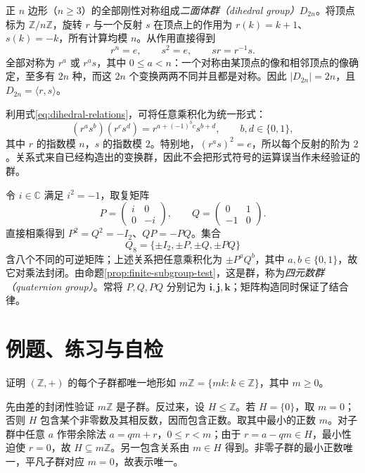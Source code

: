 \begin{example}[二面体群]\label{ex:dihedral-group}
正 $n$ 边形（$n\geq3$）的全部刚性对称组成\emph{二面体群（dihedral group）}$D_{2n}$。将顶点标为 $\mathbb Z/n\mathbb Z$，旋转 $r$ 与一个反射 $s$ 在顶点上的作用为 $r(k)=k+1$、$s(k)=-k$，所有计算均模 $n$。从作用直接得到
\begin{equation}\label{eq:dihedral-relations}
  r^n=e,\qquad s^2=e,\qquad sr=r^{-1}s.
\end{equation}
全部对称为 $r^a$ 或 $r^as$，其中 $0\leq a<n$：一个对称由某顶点的像和相邻顶点的像确定，至多有 $2n$ 种，而这 $2n$ 个变换两两不同并且都是对称。因此 $|D_{2n}|=2n$，且 $D_{2n}=\langle r,s\rangle$。
\end{example}

利用式\eqref{eq:dihedral-relations}，可将任意乘积化为统一形式：
\begin{equation}\label{eq:dihedral-multiplication}
  (r^as^b)(r^cs^d)=r^{a+(-1)^bc}s^{b+d},
  \qquad b,d\in\{0,1\},
\end{equation}
其中 $r$ 的指数模 $n$，$s$ 的指数模 $2$。特别地，$(r^as)^2=e$，所以每个反射的阶为 $2$。关系式来自已经构造出的变换群，因此不会把形式符号的运算误当作未经验证的群。

\begin{example}[四元数群]\label{ex:quaternion-group}
令 $i\in\mathbb C$ 满足 $i^2=-1$，取复矩阵
\[
  P=\begin{pmatrix}i&0\\0&-i\end{pmatrix},\qquad
  Q=\begin{pmatrix}0&1\\-1&0\end{pmatrix}.
\]
直接相乘得到 $P^2=Q^2=-I_2$、$QP=-PQ$。集合
\[
  Q_8=\{\pm I_2,\pm P,\pm Q,\pm PQ\}
\]
含八个不同的可逆矩阵；上述关系把任意乘积化为 $\pm P^aQ^b$，其中 $a,b\in\{0,1\}$，故它对乘法封闭。由命题\ref{prop:finite-subgroup-test}，这是群，称为\emph{四元数群（quaternion group）}。常将 $P,Q,PQ$ 分别记为 $\boldsymbol i,\boldsymbol j,\boldsymbol k$；矩阵构造同时保证了结合律。
\end{example}

\section{例题、练习与自检}

\begin{example}[整数加法群的全部子群]\label{ex:integer-subgroups}
证明 $(\mathbb Z,+)$ 的每个子群都唯一地形如 $m\mathbb Z=\{mk:k\in\mathbb Z\}$，其中 $m\geq0$。
\end{example}
\begin{solve}
先由差的封闭性验证 $m\mathbb Z$ 是子群。反过来，设 $H\leq\mathbb Z$。若 $H=\{0\}$，取 $m=0$；否则 $H$ 包含某个非零数及其相反数，因而包含正数。取其中最小的正数 $m$。对子群中任意 $a$ 作带余除法 $a=qm+r$，$0\leq r<m$；由于 $r=a-qm\in H$，最小性迫使 $r=0$，故 $H\subseteq m\mathbb Z$。另一包含关系由 $m\in H$ 得到。非零子群的最小正数唯一，平凡子群对应 $m=0$，故表示唯一。
\end{solve}

